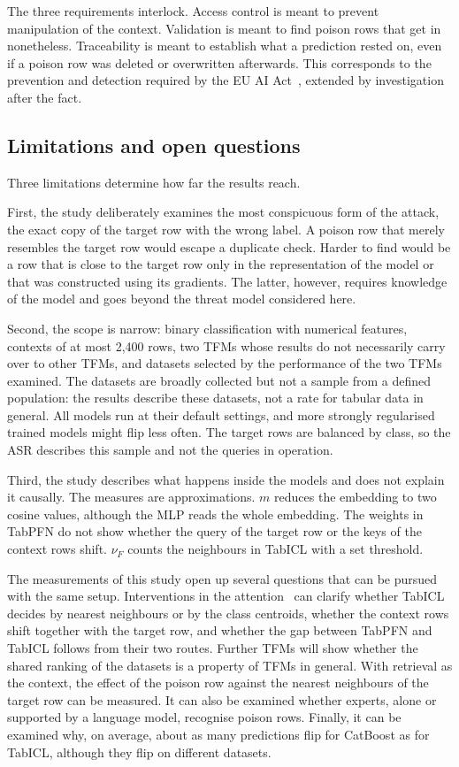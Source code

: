 \documentclass[pdflatex,sn-mathphys-num]{sn-jnl}
\begin{document}
The three requirements interlock. Access control is meant to prevent manipulation of the
context. Validation is meant to find poison rows that get in
nonetheless. Traceability is meant to establish what a prediction
rested on, even if a poison row was deleted or overwritten afterwards. This corresponds to the prevention
and detection required by the EU AI Act~\citep[Art.~15(5)]{euaiact2024},
extended by investigation after the fact.

\subsection{Limitations and open questions}
\label{sec:grenzen}

Three limitations determine how far the results reach.

First, the study deliberately examines the most conspicuous form of the
attack, the exact copy of the target row with the wrong label. A poison
row that merely resembles the target row would escape a duplicate check.
Harder to find would be a row that is close to the target row only in
the representation of the model or that was constructed using its
gradients. The latter, however, requires knowledge of the model and goes
beyond the threat model considered here.

Second, the scope is narrow: binary classification with numerical
features, contexts of at most 2,400 rows, two TFMs whose results do not
necessarily carry over to other TFMs, and datasets selected by the
performance of the two TFMs examined. The datasets are broadly collected
but not a sample from a defined population: the results describe these
datasets, not a rate for tabular data in general. All models run at
their default settings, and more strongly regularised trained models
might flip less often. The target rows are balanced by class, so the ASR
describes this sample and not the queries in operation.

Third, the study describes what happens inside the models and does not
explain it causally. The measures are approximations. $m$ reduces the
embedding to two cosine values, although the MLP reads the whole
embedding. The weights in TabPFN do not show whether the query of the
target row or the keys of the context rows shift. $\nu_F$ counts the
neighbours in TabICL with a set threshold.

The measurements of this study open up several questions that can be
pursued with the same setup. Interventions in the
attention~\citep{vig2020, meng2022} can clarify whether TabICL decides by
nearest neighbours or by the class centroids, whether the context rows
shift together with the target row, and whether the gap between TabPFN
and TabICL follows from their two routes. Further TFMs will show whether
the shared ranking of the datasets is a property of TFMs in general.  With
retrieval as the context, the effect of the poison row against the
nearest neighbours of the target row can be measured. It can also be examined whether experts, alone or supported by a language
model, recognise poison rows. Finally, it can be examined why, on
average, about as many predictions flip for CatBoost as for TabICL,
although they flip on different datasets.
\end{document}
